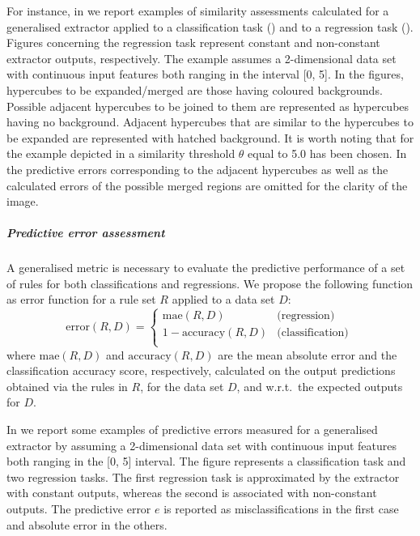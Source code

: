 \documentclass[
]{ceurart}
\begin{document}


For instance, in  we report examples of similarity assessments calculated for a generalised extractor applied to a classification task () and to a regression task ().
%
Figures concerning the regression task represent constant and non-constant extractor outputs, respectively.
%
The example assumes a 2-dimensional data set with continuous input features both ranging in the interval [0, 5].
%
In the figures, hypercubes to be expanded/merged are those having coloured backgrounds.
%
Possible adjacent hypercubes to be joined to them are represented as hypercubes having no background.
%
Adjacent hypercubes that are similar to the hypercubes to be expanded are represented with hatched background.
%
It is worth noting that for the example depicted in  a similarity threshold $\theta$ equal to 5.0 has been chosen.
%
In  the predictive errors corresponding to the adjacent hypercubes as well as the calculated errors of the possible merged regions are omitted for the clarity of the image.

\subparagraph{Predictive error assessment}

A generalised metric is necessary to evaluate the predictive performance of a set of rules for both classifications and regressions.
%
We propose the following function as error function for a rule set $R$ applied to a data set $D$:
%
\begin{equation}\label{eq:error}
	\text{error}(R, D) = 
	\begin{cases}
		\text{mae}(R, D) & \text{(regression)}\\
		1 - \text{accuracy}(R, D) & \text{(classification)}\\
	\end{cases}\,
\end{equation}
%
where $\text{mae}(R, D)$ and $\text{accuracy}(R, D)$ are the mean absolute error and the classification accuracy score, respectively, calculated on the output predictions obtained via the rules in $R$, for the data set $D$, and w.r.t.\ the expected outputs for $D$.



In  we report some examples of predictive errors measured for a generalised extractor by assuming a 2-dimensional data set with continuous input features both ranging in the [0, 5] interval.
%
The figure represents a classification task and two regression tasks.
%
The first regression task is approximated by the extractor with constant outputs, whereas the second is associated with non-constant outputs.
%
The predictive error $e$ is reported as misclassifications in the first case and absolute error in the others.
 
\end{document}
